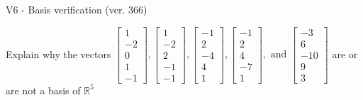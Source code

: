 \begin{exercise}
  \begin{exerciseTitle}V6 - Basis verification (ver. 366)\end{exerciseTitle}
  \begin{exerciseStatement}
    Explain why the vectors \(\left[\begin{array}{r}
1 \\
-2 \\
0 \\
1 \\
-1
\end{array}\right] , \left[\begin{array}{r}
1 \\
-2 \\
2 \\
-1 \\
-1
\end{array}\right] , \left[\begin{array}{r}
-1 \\
2 \\
-4 \\
4 \\
1
\end{array}\right] , \left[\begin{array}{r}
-1 \\
2 \\
4 \\
-7 \\
1
\end{array}\right] , \text{ and } \left[\begin{array}{r}
-3 \\
6 \\
-10 \\
9 \\
3
\end{array}\right]\) are or are not a basis of \(\mathbb{R}^5\)	



\end{exerciseStatement}
\end{exercise}
